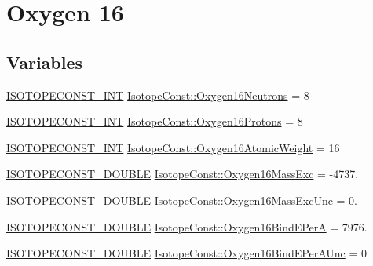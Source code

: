 \hypertarget{group___isotope_const-_oxygen-_o16}{}\section{Oxygen 16}
\label{group___isotope_const-_oxygen-_o16}
\subsection*{Variables}
\begin{DoxyCompactItemize}
\item 
\mbox{\hyperlink{group___isotope_const-_macros_ga5f18360b3e99483a35c32d789e62621c}{I\+S\+O\+T\+O\+P\+E\+C\+O\+N\+S\+T\+\_\+\+I\+NT}} \mbox{\hyperlink{group___isotope_const-_oxygen-_o16_ga020df83bfe6c89090b07053d32e80280}{Isotope\+Const\+::\+Oxygen16\+Neutrons}} = 8
\item 
\mbox{\hyperlink{group___isotope_const-_macros_ga5f18360b3e99483a35c32d789e62621c}{I\+S\+O\+T\+O\+P\+E\+C\+O\+N\+S\+T\+\_\+\+I\+NT}} \mbox{\hyperlink{group___isotope_const-_oxygen-_o16_gac8417c6e18fefa2ab8d6e85e1a7f89ec}{Isotope\+Const\+::\+Oxygen16\+Protons}} = 8
\item 
\mbox{\hyperlink{group___isotope_const-_macros_ga5f18360b3e99483a35c32d789e62621c}{I\+S\+O\+T\+O\+P\+E\+C\+O\+N\+S\+T\+\_\+\+I\+NT}} \mbox{\hyperlink{group___isotope_const-_oxygen-_o16_ga7a5a0b6e4dc7e242f6d1768268997026}{Isotope\+Const\+::\+Oxygen16\+Atomic\+Weight}} = 16
\item 
\mbox{\hyperlink{group___isotope_const-_macros_ga8f45a7272ce02c0b4c65c44636ed719a}{I\+S\+O\+T\+O\+P\+E\+C\+O\+N\+S\+T\+\_\+\+D\+O\+U\+B\+LE}} \mbox{\hyperlink{group___isotope_const-_oxygen-_o16_ga664d6c91749de156750815d3178bc92c}{Isotope\+Const\+::\+Oxygen16\+Mass\+Exc}} = -\/4737.
\item 
\mbox{\hyperlink{group___isotope_const-_macros_ga8f45a7272ce02c0b4c65c44636ed719a}{I\+S\+O\+T\+O\+P\+E\+C\+O\+N\+S\+T\+\_\+\+D\+O\+U\+B\+LE}} \mbox{\hyperlink{group___isotope_const-_oxygen-_o16_gac141038bedb6843a3555569fe45e0176}{Isotope\+Const\+::\+Oxygen16\+Mass\+Exc\+Unc}} = 0.
\item 
\mbox{\hyperlink{group___isotope_const-_macros_ga8f45a7272ce02c0b4c65c44636ed719a}{I\+S\+O\+T\+O\+P\+E\+C\+O\+N\+S\+T\+\_\+\+D\+O\+U\+B\+LE}} \mbox{\hyperlink{group___isotope_const-_oxygen-_o16_ga1032c12268c77d61cbf1b809ee7cb5f0}{Isotope\+Const\+::\+Oxygen16\+Bind\+E\+PerA}} = 7976.
\item 
\mbox{\hyperlink{group___isotope_const-_macros_ga8f45a7272ce02c0b4c65c44636ed719a}{I\+S\+O\+T\+O\+P\+E\+C\+O\+N\+S\+T\+\_\+\+D\+O\+U\+B\+LE}} \mbox{\hyperlink{group___isotope_const-_oxygen-_o16_ga1894c6d74beaa59181ab46bd4916294f}{Isotope\+Const\+::\+Oxygen16\+Bind\+E\+Per\+A\+Unc}} = 0

\end{DoxyCompactItemize}
